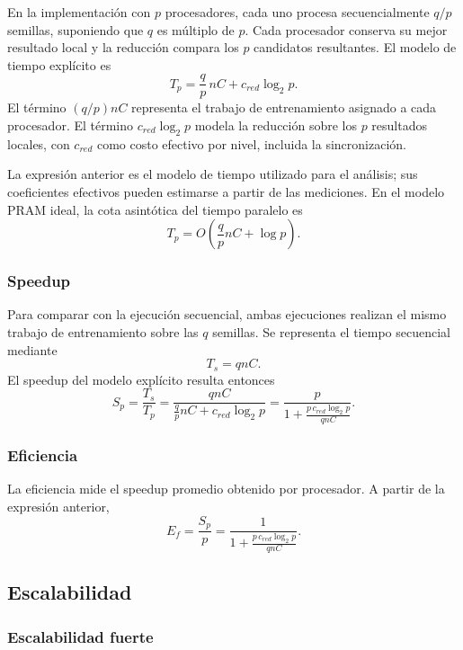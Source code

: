 \documentclass[11pt, a4paper]{article}
\begin{document}
En la implementación con $p$ procesadores, cada uno procesa secuencialmente $q/p$ semillas, suponiendo que $q$ es múltiplo de $p$. Cada procesador conserva su mejor resultado local y la reducción compara los $p$ candidatos resultantes. El modelo de tiempo explícito es
\begin{equation}
T_p=\frac{q}{p}\,nC+c_{red}\log_2 p.
\label{eq:tp_explicito}
\end{equation}
El término $(q/p)nC$ representa el trabajo de entrenamiento asignado a cada procesador. El término $c_{red}\log_2 p$ modela la reducción sobre los $p$ resultados locales, con $c_{red}$ como costo efectivo por nivel, incluida la sincronización.

La expresión anterior es el modelo de tiempo utilizado para el análisis; sus coeficientes efectivos pueden estimarse a partir de las mediciones. En el modelo PRAM ideal, la cota asintótica del tiempo paralelo es
\[
T_p=O\left(\frac{q}{p}nC+\log p\right).
\]

\subsubsection{Speedup}

Para comparar con la ejecución secuencial, ambas ejecuciones realizan el mismo trabajo de entrenamiento sobre las $q$ semillas. Se representa el tiempo secuencial mediante
\[
T_s=qnC.
\]
El speedup del modelo explícito resulta entonces
\begin{equation}
S_p=\frac{T_s}{T_p}
 =\frac{qnC}{\frac{q}{p}nC+c_{red}\log_2 p}
 =\frac{p}{1+\frac{p\,c_{red}\log_2 p}{qnC}}.
\label{eq:speedup}
\end{equation}


\subsubsection{Eficiencia}

La eficiencia mide el speedup promedio obtenido por procesador. A partir de la expresión anterior,
\begin{equation}
E_f=\frac{S_p}{p}
 =\frac{1}{1+\frac{p\,c_{red}\log_2 p}{qnC}}.
\label{eq:eficiencia}
\end{equation}

\subsection{Escalabilidad}

\subsubsection{Escalabilidad fuerte}
\end{document}

